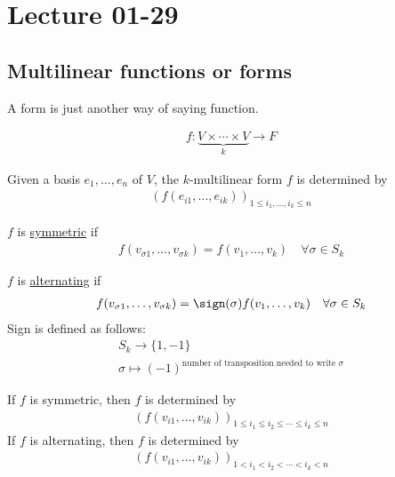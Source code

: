 \documentclass[class=scrartcl, crop=false]{standalone}
\date{2020-01-29}
\begin{document}
\section{Lecture 01-29}

\subsection{Multilinear functions or forms}

\begin{note}
  A form is just another way of saying function.
\end{note} 

\begin{gather*}
  f: \underbrace{V \times \cdots \times V}_{k} \to F
\end{gather*} 


Given a basis $e_1, \dots, e_n$ of $V$, the $k$-multilinear form $f$ is determined by 
\begin{gather*}
  (f(e_{i1}, \dots, e_{ik}))_{1 \leq i_1, \dots, i_k \leq n}
\end{gather*} 

\begin{definition}
  $f$ is \ul{symmetric} if 
  \begin{gather*}
    f(v_{\sigma 1}, \dots, v_{\sigma k}) = f(v_1, \dots, v_k) \quad \forall \sigma \in S_k
  \end{gather*} 
\end{definition} 

\begin{definition}
  $f$ is \ul{alternating} if 
  \begin{gather*}
    f(v_{\sigma 1}, \dots, v_{\sigma k}) = \sign(\sigma) f(v_1, \dots, v_k) \quad \forall \sigma \in S_k
  \end{gather*} 
  Sign is defined as follows:
  \begin{gather*}
    S_k \to \{1, -1\} \\
    \sigma \mapsto (-1)^{\text{number of transposition needed to write $\sigma$}}
  \end{gather*} 
\end{definition} 

\begin{remark}
  If $f$ is symmetric, then $f$ is determined by 
  \begin{gather*}
    (f(v_{i 1}, \dots, v_{i k}))_{1 \leq i_1 \leq i_2 \leq \cdots \leq i_k \leq n}
  \end{gather*} 
  If $f$ is alternating, then $f$ is determined by 
  \begin{gather*}
    (f(v_{i 1}, \dots, v_{i k}))_{1 < i_1 < i_2 < \cdots < i_k < n} %
  \end{gather*} 
\end{remark} 
\end{document}
